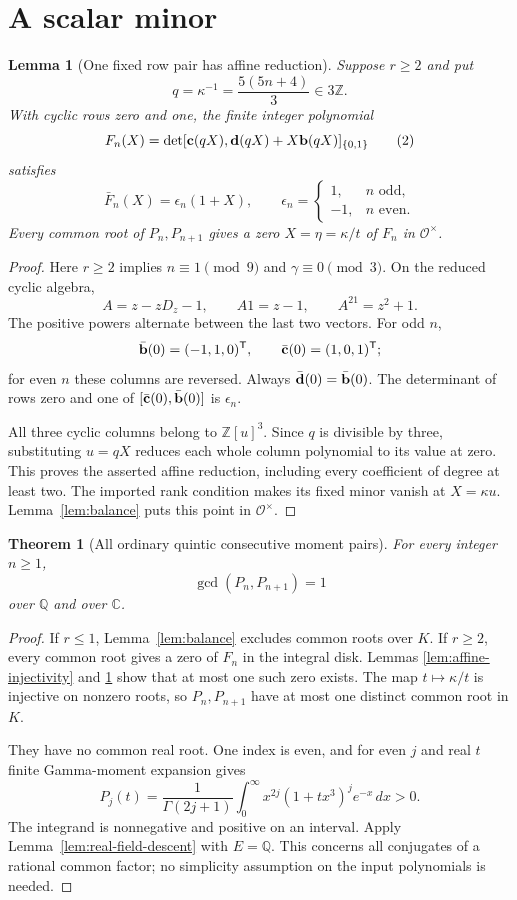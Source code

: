 \documentclass[11pt]{article}
\newtheorem{lemma}{Lemma}
\newtheorem{theorem}{Theorem}
\begin{document}
\section{A scalar minor}
\begin{lemma}[One fixed row pair has affine reduction]
\label{lem:fixed-row-minor}
Suppose $r\ge2$ and put
\[
 q=\kappa^{-1}=\frac{5(5n+4)}3\in3\mathbb Z .
\]
With cyclic rows zero and one, the finite integer polynomial
\[
 F_n(X)=
 \det[{\bf c}(qX),{\bf d}(qX)+X{\bf b}(qX)]_{\{0,1\}}
                                                        \tag{2}\label{eq:scalar-minor}
\]
satisfies
\[
 \bar F_n(X)=\epsilon_n(1+X),\qquad
 \epsilon_n=\begin{cases}1,&n\text{ odd},\\-1,&n\text{ even}.
 \end{cases}
\]
Every common root of $P_n,P_{n+1}$ gives a zero
$X=\eta=\kappa/t$ of $F_n$ in $\mathcal O^\times$.
\end{lemma}
\begin{proof}
Here $r\ge2$ implies $n\equiv1\pmod9$ and $\gamma\equiv0\pmod3$.
On the reduced cyclic algebra,
\[
 A=z-zD_z-1,\qquad A1=z-1,\qquad A^21=z^2+1.
\]
The positive powers alternate between the last two vectors.
For odd $n$,
\[
 \bar{\bf b}(0)=(-1,1,0)^{\mathsf T},\qquad
 \bar{\bf c}(0)=(1,0,1)^{\mathsf T};
\]
for even $n$ these columns are reversed.
Always $\bar{\bf d}(0)=\bar{\bf b}(0)$.
The determinant of rows zero and one of
$[\bar{\bf c}(0),\bar{\bf b}(0)]$ is $\epsilon_n$.

All three cyclic columns belong to $\mathbb Z[u]^3$.
Since $q$ is divisible by three, substituting $u=qX$ reduces each
whole column polynomial to its value at zero.
This proves the asserted affine reduction, including every
coefficient of degree at least two.
The imported rank condition makes its fixed minor vanish at
$X=\kappa u$. Lemma~\ref{lem:balance} puts this point in
$\mathcal O^\times$.
\end{proof}

\begin{theorem}[All ordinary quintic consecutive moment pairs]
\label{thm:ordinary-quintic-coprime}
For every integer $n\ge1$,
\[
 \gcd(P_n,P_{n+1})=1
\]
over $\mathbb Q$ and over $\mathbb C$.
\end{theorem}
\begin{proof}
If $r\le1$, Lemma~\ref{lem:balance} excludes common roots over $K$.
If $r\ge2$, every common root gives a zero of $F_n$ in the integral
disk. Lemmas \ref{lem:affine-injectivity} and
\ref{lem:fixed-row-minor} show that at most one such zero exists.
The map $t\mapsto\kappa/t$ is injective on nonzero roots, so
$P_n,P_{n+1}$ have at most one distinct common root in $K$.

They have no common real root. One index is even, and for even $j$
and real $t$ finite Gamma-moment expansion gives
\[
 P_j(t)=\frac1{\Gamma(2j+1)}
       \int_0^\infty x^{2j}(1+tx^3)^j e^{-x}\,dx>0.
\]
The integrand is nonnegative and positive on an interval.
Apply Lemma~\ref{lem:real-field-descent} with $E=\mathbb Q$.
This concerns all conjugates of a rational common factor;
no simplicity assumption on the input polynomials is needed.
\end{proof}
\end{document}
